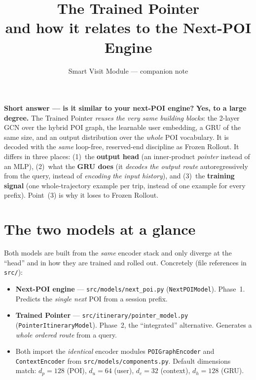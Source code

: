 \documentclass[11pt]{article}
\title{\vspace{-1.5cm}\bfseries The Trained Pointer\\[2pt]
\large and how it relates to the Next-POI Engine}
\author{Smart Visit Module --- companion note}
\date{}
\begin{document}
\maketitle
\vspace{-1.2cm}

\begin{tcolorbox}[colback=svBlueT, colframe=svBlue, arc=2pt, boxrule=0.8pt,
  left=6pt,right=6pt,top=4pt,bottom=4pt]
\textbf{Short answer --- is it similar to your next-POI engine?}
\textbf{Yes, to a large degree.} The Trained Pointer \emph{reuses the very same building blocks}:
the 2-layer GCN over the hybrid POI graph, the learnable user embedding, a GRU of the same size,
and an output distribution over the \emph{whole} POI vocabulary. It is decoded with the
\emph{same} loop-free, reserved-end discipline as Frozen Rollout. It differs in three places:
(1)~the \textbf{output head} (an inner-product \emph{pointer} instead of an MLP),
(2)~what the \textbf{GRU does} (it \emph{decodes the output route} autoregressively from the query,
instead of \emph{encoding the input history}), and
(3)~the \textbf{training signal} (one whole-trajectory example per trip, instead of one example for
every prefix). Point~(3) is why it loses to Frozen Rollout.
\end{tcolorbox}

\section{The two models at a glance}

Both models are built from the \emph{same} encoder stack and only diverge at the ``head'' and in
how they are trained and rolled out. Concretely (file references in \texttt{src/}):

\begin{itemize}[leftmargin=1.4em,itemsep=2pt]
  \item \textbf{Next-POI engine} --- \texttt{src/models/next\_poi.py} (\texttt{NextPOIModel}). Phase~1.
        Predicts the \emph{single next} POI from a session prefix.
  \item \textbf{Trained Pointer} --- \texttt{src/itinerary/pointer\_model.py}
        (\texttt{PointerItineraryModel}). Phase~2, the ``integrated'' alternative.
        Generates a \emph{whole ordered route} from a query.
  \item Both import the \emph{identical} encoder modules \texttt{POIGraphEncoder} and
        \texttt{ContextEncoder} from \texttt{src/models/components.py}. Default dimensions match:
        $d_p=128$ (POI), $d_u=64$ (user), $d_c=32$ (context), $d_h=128$ (GRU).
\end{itemize}
\end{document}
